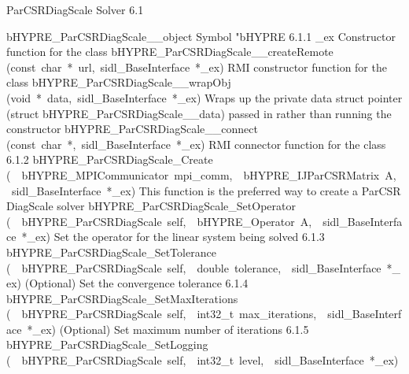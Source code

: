 \documentclass{article}
\begin{document}
\begin{cxxentry}
\begin{cxxdoc}
\end{cxxdoc}
\begin{cxxentry}
{}
        {ParCSRDiagScale Solver}
        {}
        {
}
        {6.1}
\begin{cxxnames}
        {bHYPRE\_ParCSRDiagScale\_\_object}
        {}
        {
Symbol "bHYPRE}
        {6.1.1}
        {\_ex}
        {}
        {
Constructor function for the class}
        {}
\label{cxx.6.1.11}
        {bHYPRE\_ParCSRDiagScale\_\_createRemote}
        {(const\ char\ *\ url,\ sidl\_BaseInterface\ *\_ex)}
        {
RMI constructor function for the class}
        {}
\label{cxx.6.1.12}
        {bHYPRE\_ParCSRDiagScale\_\_wrapObj}
        {(void\ *\ data,\ sidl\_BaseInterface\ *\_ex)}
        {
Wraps up the private data struct pointer (struct bHYPRE\_ParCSRDiagScale\_\_data) passed in rather than running the constructor}
        {}
\label{cxx.6.1.13}
        {bHYPRE\_ParCSRDiagScale\_\_connect}
        {(const\ char\ *,\ sidl\_BaseInterface\ *\_ex)}
        {
RMI connector function for the class}
        {6.1.2}
        {bHYPRE\_ParCSRDiagScale\_Create}
        {(\ \ bHYPRE\_MPICommunicator\ mpi\_comm,\ \ bHYPRE\_IJParCSRMatrix\ A,\ \ sidl\_BaseInterface\ *\_ex)}
        {
This function is the preferred way to create a ParCSR DiagScale solver}
        {}
\label{cxx.6.1.14}
        {bHYPRE\_ParCSRDiagScale\_SetOperator}
        {(\ \ bHYPRE\_ParCSRDiagScale\ self,\ \ bHYPRE\_Operator\ A,\ \ sidl\_BaseInterface\ *\_ex)}
        {
Set the operator for the linear system being solved}
        {6.1.3}
        {bHYPRE\_ParCSRDiagScale\_SetTolerance}
        {(\ \ bHYPRE\_ParCSRDiagScale\ self,\ \ double\ tolerance,\ \ sidl\_BaseInterface\ *\_ex)}
        {
(Optional) Set the convergence tolerance}
        {6.1.4}
        {bHYPRE\_ParCSRDiagScale\_SetMaxIterations}
        {(\ \ bHYPRE\_ParCSRDiagScale\ self,\ \ int32\_t\ max\_iterations,\ \ sidl\_BaseInterface\ *\_ex)}
        {
(Optional) Set maximum number of iterations}
        {6.1.5}
        {bHYPRE\_ParCSRDiagScale\_SetLogging}
        {(\ \ bHYPRE\_ParCSRDiagScale\ self,\ \ int32\_t\ level,\ \ sidl\_BaseInterface\ *\_ex)}

\end{cxxnames}
\end{cxxentry}
\end{cxxentry}
\end{document}
